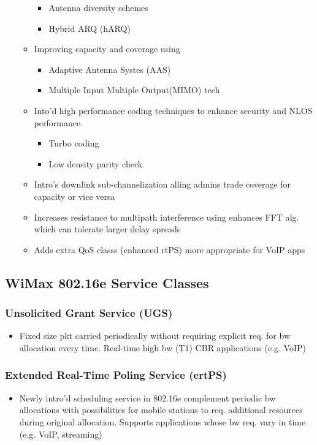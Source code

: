 \begin{itemize}
\begin{itemize}
\begin{itemize}
			\item Antenna diversity schemes
			\item Hybrid ARQ (hARQ)
		\end{itemize}
		\item Improving capacity and coverage using
		\begin{itemize}
			\item Adaptive Antenna Systes (AAS)
			\item Multiple Input Multiple Output(MIMO) tech
		\end{itemize}
		\item Into'd high performance coding techniques to enhance
			security and NLOS performance
		\begin{itemize}
			\item Turbo coding
			\item Low density parity check
		\end{itemize}
		\item Intro's downlink sub-channelization alling admins trade
			coverage for capacity or vice versa
		\item Increases resistance to multipath interference using
			enhances FFT alg. which can tolerate larger delay
			spreads
		\item Adds extra QoS classs (enhanced rtPS) more appropriate for
			VoIP apps
	\end{itemize}
\end{itemize}
\subsection{WiMax 802.16e Service Classes}
\subsubsection{Unsolicited Grant Service (UGS)}
\begin{itemize}
	\item Fixed size pkt carried periodically without requiring explicit
		req. for bw allocation every time. Real-time high bw (T1) CBR
		applications (e.g. VoIP)
\end{itemize}
\subsubsection{Extended Real-Time Poling Service (ertPS)}
\begin{itemize}
	\item Newly intro'd scheduling service in 802.16e complement periodic bw
		allocations with possibilities for mobile stations to req.
		additional resources during original allocation. Supports
		applications whose bw req. vary in time (e.g. VoIP, streaming)
\end{itemize}
